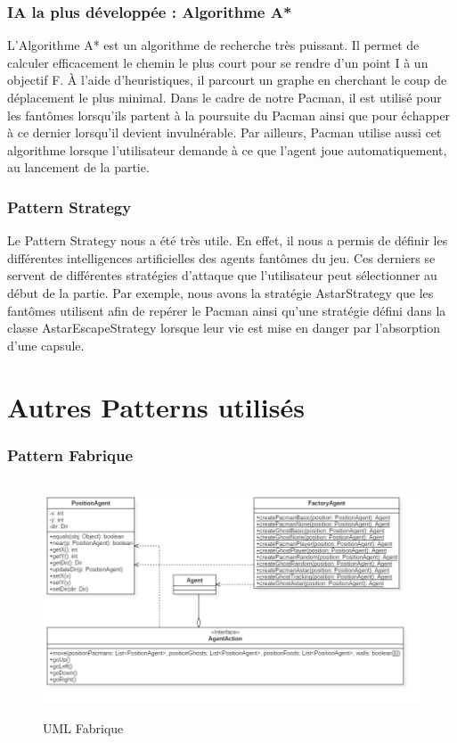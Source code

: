 \documentclass[a4paper, 11pt]{article}
\begin{document}
\section*{IA la plus développée : Algorithme A*}
  
L'Algorithme A* est un algorithme de recherche très puissant. Il permet de calculer efficacement le chemin le plus court pour se rendre d'un point I à un objectif F.
À l'aide d'heuristiques, il parcourt un graphe en cherchant le coup de déplacement le plus minimal. Dans le cadre de notre Pacman, il est utilisé
pour les fantômes lorsqu'ils partent à la poursuite du Pacman ainsi que pour échapper à ce dernier lorsqu'il devient invulnérable. Par ailleurs,
Pacman utilise aussi cet algorithme lorsque l'utilisateur demande à ce que l'agent joue automatiquement, au lancement de la partie. \\

\section*{Pattern Strategy}
  
Le Pattern Strategy nous a été très utile. En effet, il nous a permis de définir les différentes intelligences artificielles des agents fantômes 
du jeu. Ces derniers se servent de différentes stratégies d'attaque que l'utilisateur peut sélectionner au début de la partie. Par exemple, nous avons la stratégie AstarStrategy que les fantômes utilisent afin de repérer le Pacman ainsi qu'une stratégie défini dans la classe 
AstarEscapeStrategy lorsque leur vie est mise en danger par l'absorption d'une capsule.

\part{Autres Patterns utilisés}

\section*{Pattern Fabrique}
  
\begin{figure}[H]
  \begin{center}
  \includegraphics[height=7cm]{img/png/factory}
  \end{center}
  \caption[schema]{UML Fabrique}
\end{figure}
\end{document}
